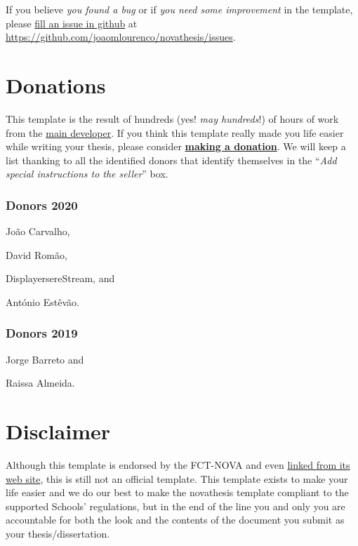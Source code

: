 If you believe \emph{you found a bug} or if \emph{you need some improvement} in the template, please \href{https://github.com/joaomlourenco/novathesis/issues}{fill an issue in github} at \url{https://github.com/joaomlourenco/novathesis/issues}.


\section{Donations}
\label{sec:donations}

This template is the result of hundreds (yes! \emph{may hundreds}!) of hours of work from the \href{https://docentes.fct.unl.pt/joao-lourenco}{main developer}.  If you think this template really made you life easier while writing your thesis, please consider \href{https://paypal.me/novathesis}{\textbf{making a donation}}. We will keep a list thanking to all the identified donors that identify themselves in the “\emph{Add special instructions to the seller}” box.

\subsubsection*{Donors 2020}
\label{ssub:donors_2020}

\begin{inparaitem}[]
  \item João Carvalho, 
  \item David Romão, 
  \item DisplayersereStream, and
  \item António Estêvão.  
\end{inparaitem}

\subsubsection*{Donors 2019}
\label{ssub:donors_2019}

\begin{inparaitem}[]
  \item Jorge Barreto and
  \item Raissa Almeida.  
\end{inparaitem}



\section{Disclaimer}
\label{sec:disclaimer}

Although this template is endorsed by the FCT-NOVA and even \href{https://www.fct.unl.pt/estudante/informacao-academica}{linked from its web site}, this is still not an official template.
%
This template exists to make your life easier and we do our best to make the \gls{novathesis} template compliant to the supported Schools' regulations, but in the end of the line you and only you are accountable for both the look and the contents of the document you submit as your thesis/dissertation.

